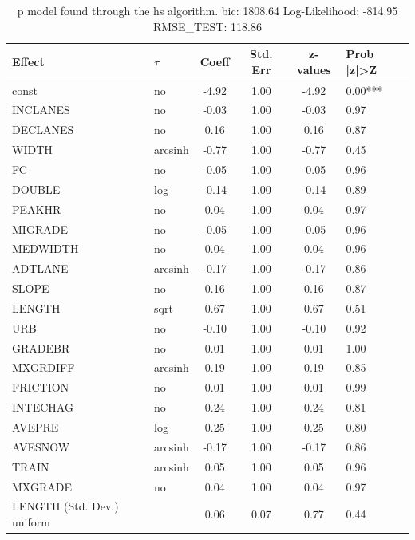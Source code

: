 \begin{table}
	\caption{p model found through the hs algorithm. bic: 1808.64 Log-Likelihood: -814.95 RMSE_TEST: 118.86}
	\begin{center}
		\begin{tabular}{|l|l|c|c|c|l|}
			\hline
			Effect & $\tau$ & Coeff & Std. Err & z-values & Prob |z|>Z \\
			\hline
			const & no & -4.92 & 1.00 & -4.92 & 0.00*** \\
			\hline
			INCLANES & no & -0.03 & 1.00 & -0.03 & 0.97 \\
			\hline
			DECLANES & no & 0.16 & 1.00 & 0.16 & 0.87 \\
			\hline
			WIDTH & arcsinh & -0.77 & 1.00 & -0.77 & 0.45 \\
			\hline
			FC & no & -0.05 & 1.00 & -0.05 & 0.96 \\
			\hline
			DOUBLE & log & -0.14 & 1.00 & -0.14 & 0.89 \\
			\hline
			PEAKHR & no & 0.04 & 1.00 & 0.04 & 0.97 \\
			\hline
			MIGRADE & no & -0.05 & 1.00 & -0.05 & 0.96 \\
			\hline
			MEDWIDTH & no & 0.04 & 1.00 & 0.04 & 0.96 \\
			\hline
			ADTLANE & arcsinh & -0.17 & 1.00 & -0.17 & 0.86 \\
			\hline
			SLOPE & no & 0.16 & 1.00 & 0.16 & 0.87 \\
			\hline
			LENGTH & sqrt & 0.67 & 1.00 & 0.67 & 0.51 \\
			\hline
			URB & no & -0.10 & 1.00 & -0.10 & 0.92 \\
			\hline
			GRADEBR & no & 0.01 & 1.00 & 0.01 & 1.00 \\
			\hline
			MXGRDIFF & arcsinh & 0.19 & 1.00 & 0.19 & 0.85 \\
			\hline
			FRICTION & no & 0.01 & 1.00 & 0.01 & 0.99 \\
			\hline
			INTECHAG & no & 0.24 & 1.00 & 0.24 & 0.81 \\
			\hline
			AVEPRE & log & 0.25 & 1.00 & 0.25 & 0.80 \\
			\hline
			AVESNOW & arcsinh & -0.17 & 1.00 & -0.17 & 0.86 \\
			\hline
			TRAIN & arcsinh & 0.05 & 1.00 & 0.05 & 0.96 \\
			\hline
			MXGRADE & no & 0.04 & 1.00 & 0.04 & 0.97 \\
			\hline
			LENGTH (Std. Dev.) uniform &  & 0.06 & 0.07 & 0.77 & 0.44 \\
			\hline

\end{tabular}
\end{center}
\end{table}
